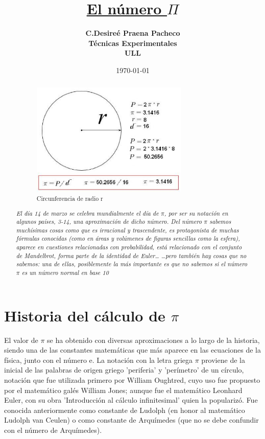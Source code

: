 \documentclass[spanish,11pt,a4paper]{article}
\begin{document}
\title{\Huge\bf{\underline{El número $\Pi$}}}
\author{\Large\bf C.Desireé Praena Pacheco\\ Técnicas Experimentales\\ ULL}
\date{\today}
\maketitle

\begin{abstract}
\begin{figure}[h]
\begin{center}
\includegraphics[width=0.75\textwidth]{pi1.eps}
\end{center}
\caption{Circunferencia de radio r}
\end{figure}


{\it\large El día 14 de marzo se celebra mundialmente el día de $\pi$, por ser su notación en algunos países, 3-14, una aproximación de dicho número.
Del número $\pi$ sabemos muchísimas cosas como que es irracional y trascendente, es protagonista de muchas fórmulas conocidas (como en áreas y volúmenes de figuras sencillas como la esfera), aparece en cuestiones relacionadas con probabilidad, está relacionado con el conjunto de Mandelbrot, forma parte de la identidad de Euler…
…pero también hay cosas que no sabemos: una de ellas, posiblemente la más importante es que no sabemos si el número $\pi$ es un número normal en base 10}
\end{abstract} 

\pagebreak

\section{Historia del cálculo de $\pi$}
El valor de $\pi$ se ha obtenido con diversas aproximaciones a lo largo de la historia, siendo una de las constantes matemáticas que más aparece en las ecuaciones de la física, junto con el número e.
La notación con la letra griega $\pi$ proviene de la inicial de las palabras de origen griego 'periferia' y 'perímetro' de un círculo, notación que fue utilizada primero por William Oughtred, cuyo uso fue propuesto por el matemático galés William Jones; aunque fue el matemático Leonhard Euler, con su obra 'Introducción al cálculo infinitesimal' quien la popularizó. Fue conocida anteriormente como constante de Ludolph (en honor al matemático Ludolph van Ceulen) o como constante de Arquímedes (que no se debe confundir con el número de Arquímedes).
\end{document}
